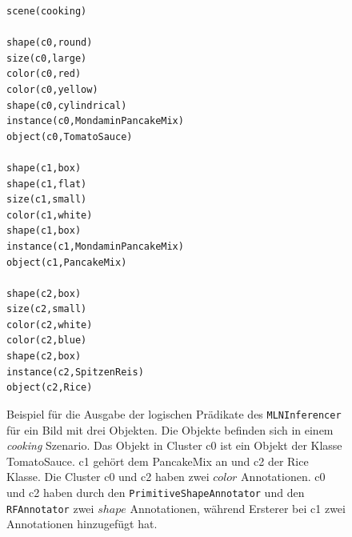 \begin{figure}
\begin{lstlisting}[backgroundcolor=\color{backcolour}]
scene(cooking)

shape(c0,round)
size(c0,large)
color(c0,red)
color(c0,yellow)
shape(c0,cylindrical)
instance(c0,MondaminPancakeMix)
object(c0,TomatoSauce)

shape(c1,box)
shape(c1,flat)
size(c1,small)
color(c1,white)
shape(c1,box)
instance(c1,MondaminPancakeMix)
object(c1,PancakeMix)

shape(c2,box)
size(c2,small)
color(c2,white)
color(c2,blue)
shape(c2,box)
instance(c2,SpitzenReis)
object(c2,Rice)
\end{lstlisting}  
\caption[Beispiel für die Ausgabe des MLNInferencer]{Beispiel für die Ausgabe der logischen Prädikate des \texttt{MLNInferencer} für ein Bild mit drei Objekten. Die Objekte befinden sich in einem \textit{cooking} Szenario. Das Objekt in Cluster c0 ist ein Objekt der Klasse TomatoSauce. c1 gehört dem PancakeMix an und c2 der Rice Klasse. Die Cluster c0 und c2 haben zwei $color$ Annotationen. c0 und c2 haben durch den \texttt{PrimitiveShapeAnnotator} und den \texttt{RFAnnotator} zwei $shape$ Annotationen, während Ersterer bei c1 zwei Annotationen hinzugefügt hat.}
\label{inferencerExample}
\end{figure}

